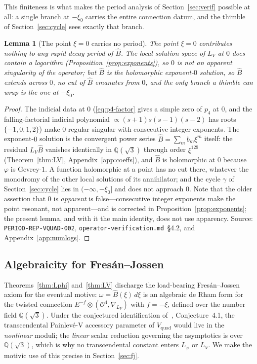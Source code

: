 \documentclass[11pt,reqno]{amsart}
\renewcommand{\_}{\vquadorigunderscore\allowbreak}
\theoremstyle{plain}
\newtheorem{lemma}[theorem]{Lemma}
\theoremstyle{definition}
\newcommand{\Vquad}{V_{\mathrm{quad}}}
\newcommand{\Bhat}{\widehat{B}}
\newcommand{\Lphi}{L_{\varphi}}
\newcommand{\LV}{L_{V}}
\newcommand{\Qsqrt}{\mathbb{Q}(\sqrt3)}
\newcommand{\xizero}{\xi_0}
\begin{document}
This finiteness is what makes the period analysis of Section~\ref{sec:verif} possible at all: a
single branch at $-\xizero$ carries the entire connection datum, and the thimble of
Section~\ref{sec:cycle} sees exactly that branch.

\begin{lemma}[The point $\xi=0$ carries no period]\label{lem:apparent}
The point $\xi=0$ contributes nothing to any rapid-decay period of $\Bhat$. The local solution
space of $\LV$ at $0$ does contain a logarithm (Proposition~\ref{prop:exponents}), so $0$ is not
an apparent singularity of the operator; but $\Bhat$ is the holomorphic exponent-$0$ solution, so
$\Bhat$ extends across $0$, no cut of $\Bhat$ emanates from $0$, and the only branch a thimble
can wrap is the one at $-\xizero$.
\end{lemma}

\begin{proof}
The indicial data at $0$ (\eqref{eq:p4-factor} gives a simple zero of $p_4$ at $0$, and the
falling-factorial indicial polynomial $\propto(s+1)s(s-1)(s-2)$ has roots $\{-1,0,1,2\}$) make
$0$ regular singular with consecutive integer exponents. The exponent-$0$ solution is the
convergent power series $\Bhat=\sum_m b_m\xi^m$ itself: the residual $\LV\Bhat$ vanishes
identically in $\Qsqrt$ through order $\xi^{129}$ (Theorem~\ref{thm:LV},
Appendix~\ref{app:coeffs}), and $\Bhat$ is holomorphic at $0$ because $\varphi$ is Gevrey-$1$.
A function holomorphic at a point has no cut there, whatever the monodromy of the other local
solutions of its annihilator; and the cycle $\gamma$ of Section~\ref{sec:cycle} lies in
$(-\infty,-\xizero]$ and does not approach $0$. Note that the older assertion that $0$ is
\emph{apparent} is false---consecutive integer exponents make the point resonant, not
apparent---and is corrected in Proposition~\ref{prop:exponents}; the present lemma, and with it
the main identity, does not use apparency. Source: \texttt{PERIOD-REP-VQUAD-002},
\texttt{operator-verification.md}~\S4.2, and Appendix~\ref{app:numlogs}.
\end{proof}

\subsection{Algebraicity for Fres\'an--Jossen}
Theorems~\ref{thm:Lphi} and~\ref{thm:LV} discharge the load-bearing Fres\'an--Jossen axiom for
the eventual motive: $\omega=\Bhat(\xi)\,d\xi$ is an algebraic de Rham form for the twisted
connection $E^{-f}\otimes(\mathcal{O}^4,\nabla_{\LV})$ with $f=-\xi$, defined over the number
field $\Qsqrt$. Under the conjectured identification of~\cite{Vquad}, Conjecture~4.1, the
transcendental Painlev\'e-V accessory parameter of $\Vquad$ would live in the
\emph{nonlinear} moduli; the \emph{linear} scalar reduction governing the asymptotics is over
$\Qsqrt$, which is why no transcendental constant enters $\Lphi$ or $\LV$. We make the motivic
use of this precise in Section~\ref{sec:fj}.
\end{document}
